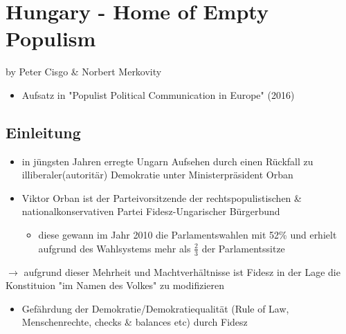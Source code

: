 \documentclass[11pt]{article}
\date{\today}
\title{}
\begin{document}
\tableofcontents

\section{Hungary - Home of Empty Populism}
\label{sec:orgbe7faad}
by Peter Cisgo \& Norbert Merkovity
\begin{itemize}
\item Aufsatz in "Populist Political Communication in Europe" (2016)
\end{itemize}


\subsection{Einleitung}
\label{sec:org122d48a}
\begin{itemize}
\item in jüngsten Jahren erregte Ungarn Aufsehen durch einen Rückfall zu illiberaler(autoritär) Demokratie unter Ministerpräsident Orban
\item Viktor Orban ist der Parteivorsitzende der rechtspopulistischen \& nationalkonservativen Partei Fidesz-Ungarischer Bürgerbund 
\begin{itemize}
\item diese gewann im Jahr 2010 die Parlamentswahlen mit 52\% und erhielt aufgrund des Wahlsystems mehr als \(\frac{2}{3}\) der Parlamentssitze
\end{itemize}
\end{itemize}
\(\rightarrow\) aufgrund dieser Mehrheit und Machtverhältnisse ist Fidesz in der Lage die Konstituion "im Namen des Volkes" zu modifizieren
\begin{itemize}
\item Gefährdung der Demokratie/Demokratiequalität (Rule of Law, Menschenrechte, checks \& balances etc) durch Fidesz
\end{itemize}
\end{document}
